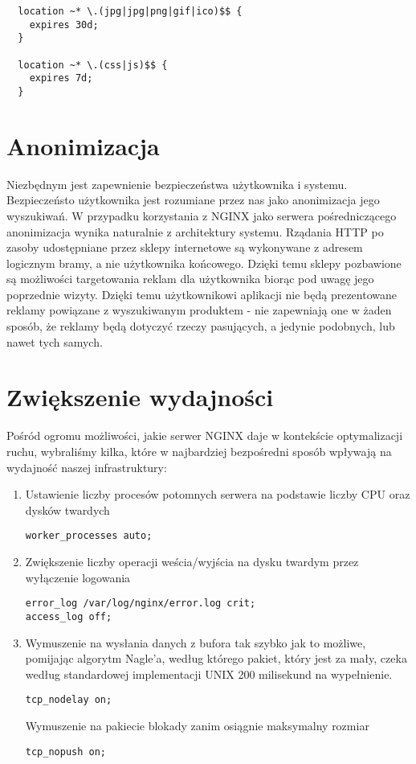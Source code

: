 \begin{lstlisting}
  location ~* \.(jpg|jpg|png|gif|ico)$$ {
    expires 30d;
  }
  
  location ~* \.(css|js)$$ {
    expires 7d;
  }
\end{lstlisting}

\section{Anonimizacja}
Niezbędnym jest zapewnienie bezpieczeństwa użytkownika i systemu.
Bezpieczeństo użytkownika jest rozumiane przez nas jako anonimizacja jego wyszukiwań. W przypadku korzystania z NGINX jako serwera pośredniczącego anonimizacja wynika naturalnie z architektury systemu.
Rządania HTTP po zasoby udostępniane przez sklepy internetowe są wykonywane z adresem logicznym bramy, a nie użytkownika końcowego.
Dzięki temu sklepy pozbawione są możliwości targetowania reklam dla użytkownika  biorąc pod uwagę jego poprzednie wizyty. Dzięki temu użytkownikowi aplikacji nie będą prezentowane reklamy powiązane z wyszukiwanym produktem - nie zapewniają one w żaden sposób, że reklamy będą dotyczyć rzeczy pasujących, a jedynie podobnych, lub nawet tych samych.

\section{Zwiększenie wydajności}
Pośród ogromu możliwości, jakie serwer NGINX daje w kontekście optymalizacji ruchu, wybraliśmy kilka, które w najbardziej bezpośredni sposób wpływają na wydajność naszej infrastruktury:

\begin{enumerate}
\item
Ustawienie liczby procesów potomnych serwera na podstawie liczby CPU oraz dysków twardych
\begin{lstlisting}
worker_processes auto;
\end{lstlisting}
\item
Zwiększenie liczby operacji weścia/wyjścia na dysku twardym przez wyłączenie logowania
\begin{lstlisting}
error_log /var/log/nginx/error.log crit;
access_log off;
\end{lstlisting}
\item
Wymuszenie na  wysłania danych z bufora tak szybko jak to możliwe, pomijając algorytm Nagle'a, według którego pakiet, który jest za mały, czeka według standardowej implementacji UNIX 200 milisekund na wypełnienie.
\begin{lstlisting}
tcp_nodelay on;
\end{lstlisting}
Wymuszenie na pakiecie blokady zanim osiągnie maksymalny rozmiar
\begin{lstlisting}
tcp_nopush on;
\end{lstlisting}
\end{enumerate}\cite{NginxOpt2:online}

